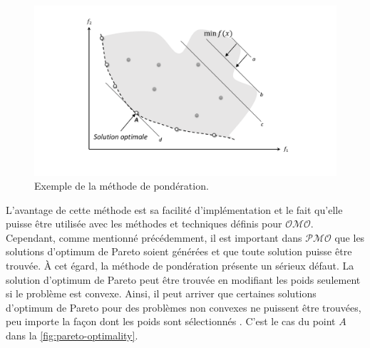 \begin{figure}
\begin{center}
\includegraphics[scale=0.4]{chapitre2/chap2Fig/weighted-sum-ex.pdf}
\caption{Exemple de la méthode de pondération.}
 \label{fig:weighted-sum-ex}
\end{center}
\end{figure}

L’avantage de cette méthode est sa facilité d’implémentation et le fait qu’elle puisse être utilisée avec les méthodes et techniques définis pour $\mathcal{OMO}$. Cependant, comme mentionné précédemment, il est important dans $\mathcal{PMO}$ que les solutions d'optimum de Pareto soient générées et que toute solution puisse être trouvée. À cet égard, la méthode de pondération présente un sérieux défaut. La solution d'optimum de Pareto peut être trouvée en modifiant les poids seulement si le problème est convexe. Ainsi, il peut arriver que certaines solutions d'optimum de Pareto pour des problèmes non convexes ne puissent être trouvées, peu importe la façon dont les poids sont sélectionnés \cite{Branke08}. C'est le cas du point $A$ dans la \ref{fig:pareto-optimality}.



